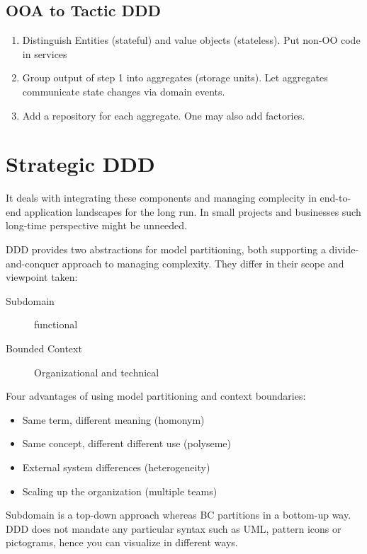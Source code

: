 \documentclass[../Main.tex]{subfiles}
\begin{document}
\subsection{OOA to Tactic DDD}
\begin{enumerate}
    \item Distinguish Entities (stateful) and value objects (stateless). Put non-OO code in services
    \item Group output of step 1 into aggregates (storage units). Let aggregates communicate state changes via domain events.
    \item Add a repository for each aggregate. One may also add factories.
\end{enumerate}
\newpage

\section{Strategic DDD}

It deals with integrating these components and managing complecity in end-to-end application landscapes for the long run.
In small projects and businesses such long-time perspective might be unneeded.

DDD provides two abstractions for model partitioning, both supporting a divide-and-conquer approach to managing complexity.
They differ in their scope and viewpoint taken:
\begin{description}
    \item[Subdomain] functional
    \item[Bounded Context] Organizational and technical  
\end{description}

Four advantages of using model partitioning and context boundaries:
\begin{itemize}
    \item Same term, different meaning (homonym)
    \item Same concept, different different use (polyseme)
    \item External system differences (heterogeneity)
    \item Scaling up the organization (multiple teams)
\end{itemize}

Subdomain is a top-down approach whereas BC partitions in a bottom-up way.
DDD does not mandate any particular syntax such as UML, pattern icons or pictograms, hence you can visualize in different ways.
\end{document}
